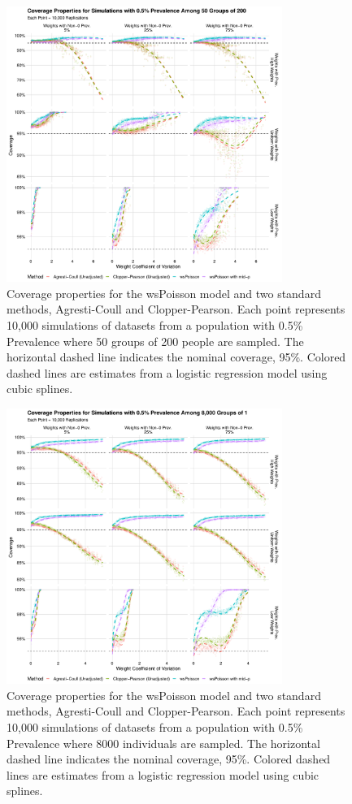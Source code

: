 \documentclass[AMA,STIX1COL]{WileyNJD-v2}
\begin{document}
\begin{figure}
\centering
\includegraphics[width=0.8\textwidth]{figures/perfect_coverage_50_groups_0_005_prev.pdf}
\caption{Coverage properties for the wsPoisson model and two standard methods, Agresti-Coull and Clopper-Pearson.
Each point represents 10,000 simulations of datasets from a population with 0.5\% Prevalence where 50 groups of 200 people are sampled.
The horizontal dashed line indicates the nominal coverage, 95\%.
Colored dashed lines are estimates from a logistic regression model using cubic splines.}
\label{fig:perfect_coverage_50_groups_0_005_prev}
\end{figure}

\begin{figure}
\centering
\includegraphics[width=0.8\textwidth]{figures/perfect_coverage_8000_groups_0_005_prev.pdf}
\caption{Coverage properties for the wsPoisson model and two standard methods, Agresti-Coull and Clopper-Pearson.
Each point represents 10,000 simulations of datasets from a population with 0.5\% Prevalence where 8000 individuals are sampled.
The horizontal dashed line indicates the nominal coverage, 95\%.
Colored dashed lines are estimates from a logistic regression model using cubic splines.}
\label{fig:perfect_coverage_8000_groups_0_005_prev}
\end{figure}
\end{document}
